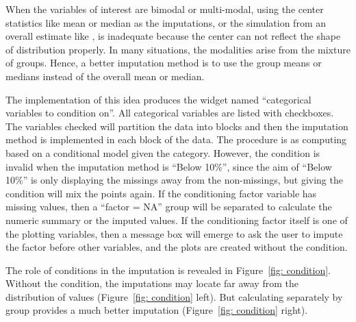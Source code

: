 \documentclass[article]{jss}
\begin{document}
When the variables of interest are bimodal or multi-modal, using the center statistics like mean or median as the imputations, or the simulation from an overall estimate like , is inadequate because the center can not reflect the shape of distribution properly. In many situations, the modalities arise from the mixture of groups. Hence, a better imputation method is to use the group means or medians instead of the overall mean or median.

The implementation of this idea produces the widget named ``categorical variables to condition on''. All categorical variables are listed with checkboxes. The variables checked will partition the data into blocks and then the imputation method is implemented in each block of the data. The procedure is as computing based on a conditional model given the category. However, the condition is invalid when the imputation method is ``Below 10\%'', since the aim of ``Below 10\%'' is only displaying the missings away from the non-missings, but giving the condition will mix the points again. If the conditioning factor variable has missing values, then a ``factor = NA'' group will be separated to calculate the numeric summary or the imputed values. If the conditioning factor itself is one of the plotting variables, then a message box will emerge to ask the user to impute the factor before other variables, and the plots are created without the condition.

The role of conditions in the imputation is revealed in Figure~\ref{fig: condition}. Without the condition, the imputations may locate far away from the distribution of values (Figure~\ref{fig: condition} left). But calculating separately by group provides a much better imputation (Figure~\ref{fig: condition} right).
\end{document}
